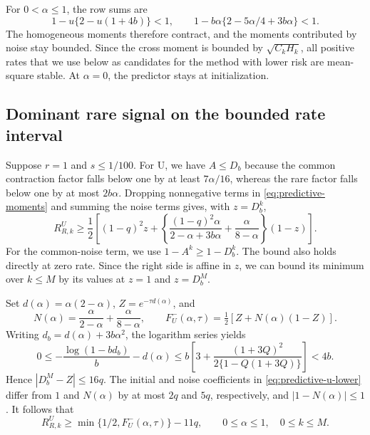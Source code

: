 For $0<\alpha\leq1$, the row sums are
\[
 1-u\{2-u(1+4b)\}<1,\qquad
 1-b\alpha\{2-5\alpha/4+3b\alpha\}<1.
\]
The homogeneous moments therefore contract, and the moments contributed by noise
stay bounded. Since the cross moment is bounded by $\sqrt{C_kH_k}$, all
positive rates that we use below as candidates for the method with lower risk
are mean-square stable. At $\alpha=0$, the predictor stays at initialization.

\subsection{Dominant rare signal on the bounded rate interval}

Suppose $r=1$ and $s\leq1/100$. For U, we have $A\leq D_b$ because the
common contraction factor falls below one by at least $7\alpha/16$, whereas
the rare factor falls below one by at most $2b\alpha$. Dropping nonnegative
terms in \eqref{eq:predictive-moments} and summing the noise terms gives, with
$z=D_b^k$,
\begin{equation}
 R_{R,k}^U\geq\frac12\left[(1-q)^2z+
   \left\{\frac{(1-q)^2\alpha}{2-\alpha+3b\alpha}
                +\frac{\alpha}{8-\alpha}\right\}(1-z)\right].
 \label{eq:predictive-u-lower}
\end{equation}
For the common-noise term, we use $1-A^k\geq1-D_b^k$. The bound also holds
directly at zero rate. Since the right side is affine in $z$, we can bound its
minimum over $k\leq M$ by its values at $z=1$ and $z=D_b^M$.

Set $d(\alpha)=\alpha(2-\alpha)$, $Z=e^{-\tau d(\alpha)}$, and
\[
 N(\alpha)=\frac{\alpha}{2-\alpha}+\frac{\alpha}{8-\alpha},\qquad
 F_U^-(\alpha,\tau)=\tfrac12[Z+N(\alpha)(1-Z)].
\]
Writing $d_b=d(\alpha)+3b\alpha^2$, the logarithm series yields
\[
 0\leq-\frac{\log(1-bd_b)}b-d(\alpha)
 \leq b\left[3+\frac{(1+3Q)^2}{2\{1-Q(1+3Q)\}}\right]<4b.
\]
Hence $|D_b^M-Z|\leq16q$. The initial and noise coefficients in
\eqref{eq:predictive-u-lower} differ from $1$ and $N(\alpha)$ by at most
$2q$ and $5q$, respectively, and $|1-N(\alpha)|\leq1$. It follows that
\begin{equation}
 R_{R,k}^U\geq\min\{1/2,F_U^-(\alpha,\tau)\}-11q,
 \qquad 0\leq\alpha\leq1,\quad 0\leq k\leq M.
 \label{eq:predictive-u-transfer}
\end{equation}

